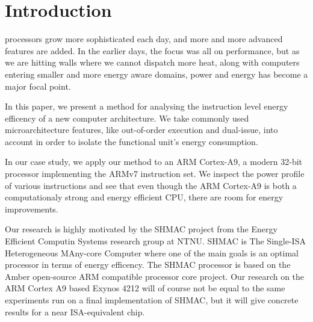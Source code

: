 \section{Introduction}

 processors grow more sophisticated each day, and more
and more advanced features are added. In the earlier days, the focus was all on
performance, but as we are hitting walls where we cannot dispatch more heat,
along with computers entering smaller and more energy aware domains, power and
energy has become a major focal point.

In this paper, we present a method for analysing the instruction level energy
efficency of a new computer architecture. We take commonly used
microarchitecture features, like out-of-order execution and dual-issue, into
account in order to isolate the functional unit's energy consumption.

In our case study, we apply our method to an ARM Cortex-A9, a modern 32-bit
processor implementing the ARMv7 instruction set. We inspect the power profile
of various instructions and see that even though the ARM Cortex-A9 is both a
computationaly strong and energy efficient CPU, there are room for energy
improvements.

Our research is highly motivated by the SHMAC project from the Energy Efficient
Computin Systems research group at NTNU. SHMAC is The Single-ISA Heterogeneous
MAny-core Computer where one of the main goals is an optimal processor in terms
of energy efficency. The SHMAC processor is based on the Amber open-source ARM
compatible processor core project. Our research on the ARM Cortex A9
based Exynos 4212 will of course not be equal to the same experiments run on
a final implementation of SHMAC, but it will give concrete results for a near
ISA-equivalent chip.


